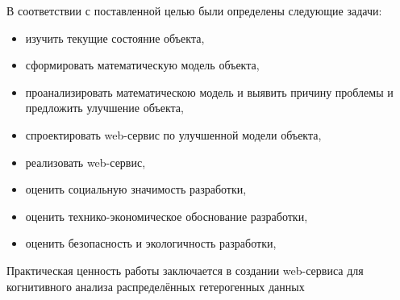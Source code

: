 В соответствии с поставленной целью были определены следующие задачи:
\begin{itemize}
    \item изучить текущие состояние объекта,
    \item сформировать математическую модель объекта,
    \item проанализировать математическою модель и выявить причину проблемы и предложить улучшение объекта, 
    \item спроектировать web-сервис по улучшенной модели объекта,
    \item реализовать web-сервис,
    \item оценить социальную значимость разработки,  
    \item оценить технико-экономическое обоснование разработки,
    \item оценить безопасность и экологичность разработки,
\end{itemize}

 Практическая ценность работы заключается в создании web-сервиса для когнитивного анализа распределённых гетерогенных данных

\pagebreak